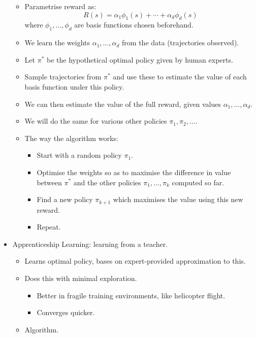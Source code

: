 \begin{itemize}
\begin{itemize}
        \item Parametrise reward as:
        \begin{equation*}
            R(s) = \alpha_1 \phi_1(s) +  \cdots + \alpha_d \phi_d(s)
        \end{equation*}
        where $\phi_1, \ldots, \phi_d$ are basis functions chosen beforehand.
        \item We learn the weights $\alpha_1, \ldots, \alpha_d$ from the data (trajectories observed).
        \item Let $\pi^*$ be the hypothetical optimal policy given by human experts.
        \item Sample trajectories from $\pi^*$ and use these to estimate the value of each basis function under this policy.
        \item We can then estimate the value of the full reward, given values $\alpha_1, \ldots, \alpha_d$.
        \item We will do the same for various other policies $\pi_1, \pi_2, \ldots$.
        \item The way the algorithm works:
        \begin{itemize}
            \item Start with a random policy $\pi_1$.
            \item Optimise the weights so as to maximise the difference in value between $\pi^*$ and the other policies $\pi_1, \ldots, \pi_k$ computed so far.
            \item Find a new policy $\pi_{k+1}$ which maximises the value using this new reward.
            \item Repeat.
        \end{itemize}
    \end{itemize}
    \item Apprenticeship Learning: learning from a teacher.
    \begin{itemize}
        \item Learns optimal policy, bases on expert-provided approximation to this.
        \item Does this with minimal exploration.
        \begin{itemize}
            \item Better in fragile training environments, like helicopter flight.
            \item Converges quicker.
        \end{itemize}
        \item Algorithm.
        \begin{itemize}

\end{itemize}
\end{itemize}
\end{itemize}
